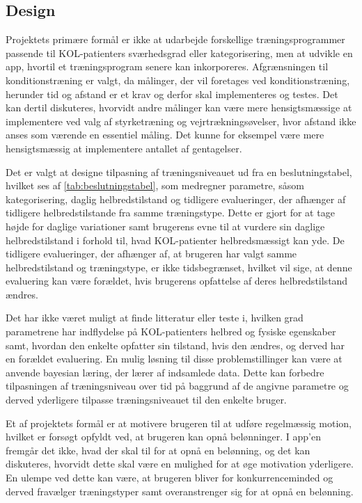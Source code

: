 \subsection{Design}
Projektets primære formål er ikke at udarbejde forskellige træningsprogrammer passende til KOL-patienters sværhedsgrad eller kategorisering, men at udvikle en app, hvortil et træningsprogram senere kan inkorporeres. Afgrænsningen til konditionstræning er valgt, da målinger, der vil foretages ved konditionstræning, herunder tid og afstand er et krav og derfor skal implementeres og testes. Det kan dertil diskuteres, hvorvidt andre målinger kan være mere hensigtsmæssige at implementere ved valg af styrketræning og vejrtrækningsøvelser, hvor afstand ikke anses som værende en essentiel måling. Det kunne for eksempel være mere hensigtsmæssig at implementere antallet af gentagelser. 

Det er valgt at designe tilpasning af træningsniveauet ud fra en beslutningstabel, hvilket ses af \autoref{tab:beslutningstabel}, som medregner parametre, såsom kategorisering, daglig helbredstilstand og tidligere evalueringer, der afhænger af tidligere helbredstilstande fra samme træningstype. Dette er gjort for at tage højde for daglige variationer samt brugerens evne til at vurdere sin daglige helbredstilstand i forhold til, hvad KOL-patienter helbredsmæssigt kan yde. De tidligere evalueringer, der afhænger af, at brugeren har valgt samme helbredstilstand og træningstype, er ikke tidsbegrænset, hvilket vil sige, at denne evaluering kan være forældet, hvis brugerens opfattelse af deres helbredstilstand ændres.

Det har ikke været muligt at finde litteratur eller teste i, hvilken grad parametrene har indflydelse på KOL-patienters helbred og fysiske egenskaber samt, hvordan den enkelte opfatter sin tilstand, hvis den ændres, og derved har en forældet evaluering. En mulig løsning til disse problemstillinger kan være at anvende bayesian læring, der lærer af indsamlede data. Dette kan forbedre tilpasningen af træningsniveau over tid på baggrund af de angivne parametre og derved yderligere tilpasse træningsniveauet til den enkelte bruger. 

Et af projektets formål er at motivere brugeren til at udføre regelmæssig motion, hvilket er forsøgt opfyldt ved, at brugeren kan opnå belønninger. I app’en fremgår det ikke, hvad der skal til for at opnå en belønning, og det kan diskuteres, hvorvidt dette skal være en mulighed for at øge motivation yderligere. En ulempe ved dette kan være, at brugeren bliver for konkurrenceminded og derved fravælger træningstyper samt overanstrenger sig for at opnå en belønning.

